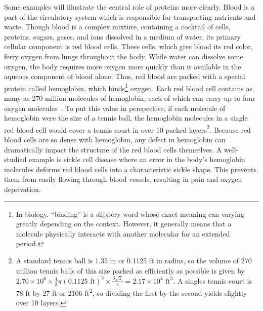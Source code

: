 Some examples will illustrate the central role of proteins more clearly. Blood is a part of the circulatory system which is responsible for transporting nutrients and waste. Though blood is a complex mixture, containing a cocktail of cells, proteins, sugars, gases, and ions dissolved in a medium of water, its primary cellular component is red blood cells. These cells, which give blood its red color, ferry oxygen from lungs throughout the body. While water can dissolve some oxygen, the body requires more oxygen more quickly than is available in the aqueous component of blood alone. Thus, red blood are packed with a special protein called hemoglobin, which binds\footnote{In biology, ``binding'' is a slippery word whose exact meaning can varying greatly depending on the context. However, it generally means that a molecule physically interacts with another molecular for an extended period.} oxygen. Each red blood cell contains as many as 270 million molecules of hemoglobin, each of which can carry up to four oxygen molecules~\cite{Pierig2008}. To put this value in perspective, if each molecule of hemoglobin were the size of a tennis ball, the hemoglobin molecules in a single red blood cell would cover a tennis court in over 10 packed layers\footnote{A standard tennis ball is 1.35 in or 0.1125 ft in radius, so the volume of 270 million tennis balls of this size packed as efficiently as possible is given by $2.70 \times 10^6 \times \frac{4}{3} \pi (0.1125 \text{ ft})^3 \times \frac{3\sqrt{2}}{\pi} = 2.17 \times 10^4 \text{ ft}^3$. A singles tennis court is 78 ft by 27 ft or 2106 ft\textsuperscript{2}, so dividing the first by the second yields slightly over 10 layers.}. Because red blood cells are so dense with hemoglobin, any defect in hemoglobin can dramatically impact the structure of the red blood cells themselves. A well-studied example is sickle cell disease where an error in the body's hemoglobin molecules deforms red blood cells into a characteristic sickle shape. This prevents them from easily flowing through blood vessels, resulting in pain and oxygen deprivation.

